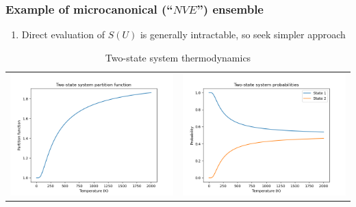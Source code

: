 \documentclass[11pt]{article}
\begin{document}
\subsubsection{Example of microcanonical (``\(NVE\)'') ensemble}
\label{sec:org02b63dd}
\begin{enumerate}
\item Direct evaluation of \(S(U)\) is generally intractable, so seek simpler approach
\end{enumerate}
\begin{table}
   \caption{Two-state system thermodynamics}
\begin{tabular}{cc}
\includegraphics[scale=0.5]{Images/2state-partition.png} & \includegraphics[scale=0.5]{Images/2state-probability.png} \\

\end{tabular}
\end{table}
\end{document}
